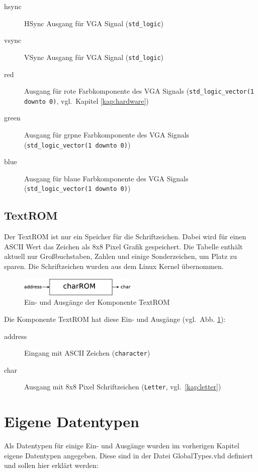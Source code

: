 \documentclass[IN,ngerman,utf8,12pt]{tumbook}
\newcommand{\vgl}{vgl.\ }
\begin{document}
\begin{description}
    \item[hsync] HSync Ausgang für VGA Signal (\texttt{std\_logic})
    \item[vsync] VSync Ausgang für VGA Signal (\texttt{std\_logic})
    \item[red] Ausgang für rote Farbkomponente des VGA Signals (\texttt{std\_logic\_vector(1 downto 0)}, \vgl Kapitel \ref{kap:hardware})
    \item[green] Ausgang für grpne Farbkomponente des VGA Signals (\texttt{std\_logic\_vector(1 downto 0)})
    \item[blue] Ausgang für blaue Farbkomponente des VGA Signals (\texttt{std\_logic\_vector(1 downto 0)})
\end{description}

\subsection{TextROM}

Der TextROM ist nur ein Speicher für die Schriftzeichen.
Dabei wird für einen ASCII Wert das Zeichen als 8x8 Pixel Grafik gespeichert.
Die Tabelle enthält aktuell nur Großbuchstaben, Zahlen und einige Sonderzeichen, um Platz zu sparen.
Die Schriftzeichen wurden aus dem Linux Kernel übernommen.

\begin{figure}[H]
    \centerline{
        \includegraphics[width=0.5\textwidth]{img/textROM}
    }
    \label{abb:textrom}
    \caption{Ein- und Ausgänge der Komponente TextROM}
\end{figure}

Die Komponente TextROM hat diese Ein- und Ausgänge (\vgl Abb. \ref{abb:textrom}):
\begin{description}
    \item[address] Eingang mit ASCII Zeichen (\texttt{character})
    \item[char] Ausgang mit 8x8 Pixel Schriftzeichen (\texttt{Letter}, \vgl \ref{kap:letter})
\end{description}

\section{Eigene Datentypen}
Als Datentypen für einige Ein- und Ausgänge wurden im vorherigen Kapitel eigene Datentypen angegeben.
Diese sind in der Datei GlobalTypes.vhd definiert und sollen hier erklärt werden:
\end{document}
